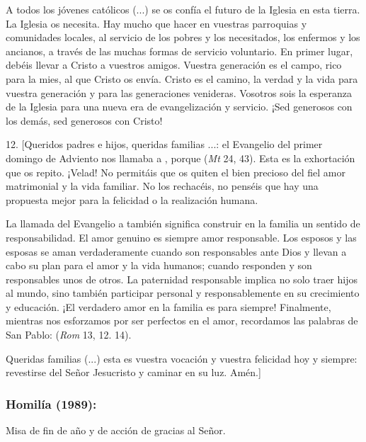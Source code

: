 \begin{body}
\begin{body}
		A todos los jóvenes católicos (...) se os confía el futuro de la Iglesia en esta tierra. La Iglesia os necesita. Hay mucho que hacer en vuestras parroquias y comunidades locales, al servicio de los pobres y los necesitados, los enfermos y los ancianos, a través de las muchas formas de servicio voluntario. En primer lugar, debéis llevar a Cristo a vuestros amigos. Vuestra generación es el campo, rico para la mies, al que Cristo os envía. Cristo es el camino, la verdad y la vida para vuestra generación y para las generaciones venideras. Vosotros sois la esperanza de la Iglesia para una nueva era de evangelización y servicio. ¡Sed generosos con los demás, sed generosos con Cristo!
		
		12. {[}Queridos padres e hijos, queridas familias ...: el Evangelio del primer domingo de Adviento nos llamaba a , porque  (\emph{Mt} 24, 43). Esta es la exhortación que os repito. ¡Velad! No permitáis que os quiten el bien precioso del fiel amor matrimonial y la vida familiar. No los rechacéis, no penséis que hay una propuesta mejor para la felicidad o la realización humana.
		
		La llamada del Evangelio a  también significa construir en la familia un sentido de responsabilidad. El amor genuino es siempre amor responsable. Los esposos y las esposas se aman verdaderamente cuando son responsables ante Dios y llevan a cabo su plan para el amor y la vida humanos; cuando responden y son responsables unos de otros. La paternidad responsable implica no solo traer hijos al mundo, sino también participar personal y responsablemente en su crecimiento y educación. ¡El verdadero amor en la familia es para siempre! Finalmente, mientras nos esforzamos por ser perfectos en el amor, recordamos las palabras de San Pablo:  (\emph{Rom} 13, 12. 14).
		
		Queridas familias (...) esta es vuestra vocación y vuestra felicidad hoy y siempre: revestirse del Señor Jesucristo y caminar en su luz. Amén.{]}
	\end{body}
	
	\subsubsection{Homilía (1989): } Misa de fin de año y  de acción de gracias al Señor.
	

\end{body}
